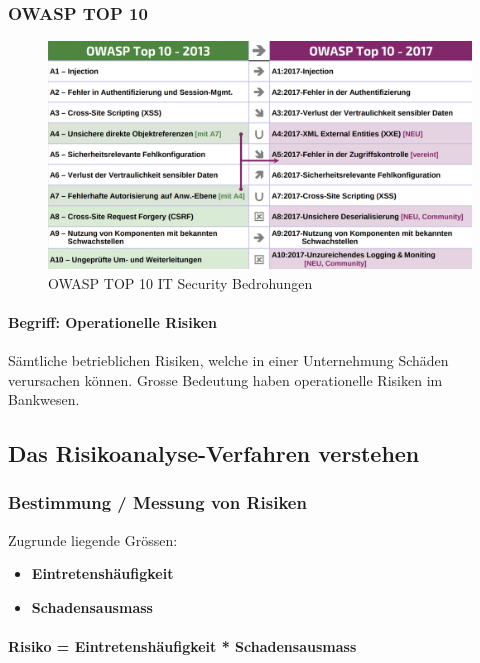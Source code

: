 \documentclass[10pt,a4paper]{article}
\begin{document}
\subsubsection*{OWASP TOP 10}
\begin{figure}[H]
    \begin{center}
    \includegraphics[width=16cm]{images/OWASP_Top_10.png}
    \caption{OWASP TOP 10 IT Security Bedrohungen}
    \label{OWASP TOP 10}
    \end{center}
\end{figure}

\paragraph*{Begriff: Operationelle Risiken} Sämtliche betrieblichen Risiken, welche in einer Unternehmung Schäden verursachen können.
Grosse Bedeutung haben operationelle Risiken im Bankwesen.


\subsection*{Das Risikoanalyse-Verfahren verstehen}
\subsubsection*{Bestimmung / Messung von Risiken}

Zugrunde liegende Grössen:
\begin{itemize}[noitemsep,topsep=0pt,leftmargin=*]
    \item \textbf{Eintretenshäufigkeit}
    \item \textbf{Schadensausmass}
\end{itemize}

\paragraph*{Risiko = Eintretenshäufigkeit * Schadensausmass}
\end{document}
